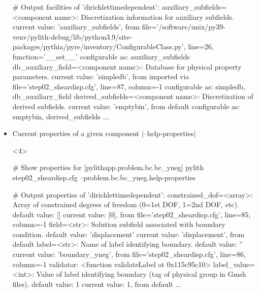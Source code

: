 \documentclass[aspectratio=169]{beamer}
\begin{document}
\begin{frame}[t,fragile]
\begin{itemize}
\begin{onlyenv}
\begin{bashcode}
        # Output
        facilities of 'dirichlettimedependent':
            auxiliary_subfields=<component name>: Discretization information for auxiliary subfields.
                current value: 'auxiliary_subfields', from {file='/software/unix/py39-venv/pylith-debug/lib/python3.9/site-packages/pythia/pyre/inventory/ConfigurableClass.py', line=26, function='__set__'}
                configurable as: auxiliary_subfields
            db_auxiliary_field=<component name>: Database for physical property parameters.
                current value: 'simpledb', from {imported} via {file='step02_sheardisp.cfg', line=87, column=-1}
                configurable as: simpledb, db_auxiliary_field
            derived_subfields=<component name>: Discretization of derived subfields.
                current value: 'emptybin', from {default}
                configurable as: emptybin, derived_subfields
            ...
      \end{bashcode}
    \end{onlyenv}
  \item Current properties of a given component \bashinline|--help-properties|
    \begin{onlyenv}<4>
      \begin{bashcode}
        # Show properties for [pylithapp.problem.bc.bc_yneg]
        pylith step02_sheardisp.cfg --problem.bc.bc_yneg.help-properties

        # Output
        properties of 'dirichlettimedependent':
            constrained_dof=<array>: Array of constrained degrees of freedom (0=1st DOF, 1=2nd DOF, etc).
                default value: []
                current value: [0], from {file='step02_sheardisp.cfg', line=85, column=-1}
            field=<str>: Solution subfield associated with boundary condition.
                default value: 'displacement'
                current value: 'displacement', from {default}
            label=<str>: Name of label identifying boundary.
                default value: ''
                current value: 'boundary_yneg', from {file='step02_sheardisp.cfg', line=86, column=-1}
                validator: <function validateLabel at 0x115c95c10>
            label_value=<int>: Value of label identifying boundary (tag of physical group in Gmsh files).
                default value: 1
                current value: 1, from {default}
            ...
      \end{bashcode}
    \end{onlyenv}
  \end{itemize}

\end{frame}
\end{document}
